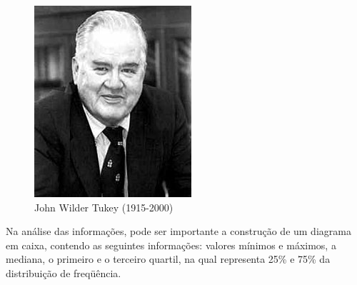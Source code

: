 \vspace{-1.5cm}
\begin{figure}
    \centering
\includegraphics[scale=0.6]{figures/John_Tukey.jpeg}
    \caption{John Wilder Tukey (1915-2000)}
    \label{fig:my_label25}
\end{figure}



Na análise das informações, pode
ser importante a construção de um diagrama em caixa, contendo as
seguintes informações: valores mínimos e máximos, a mediana, o
primeiro e o terceiro quartil, na qual representa 25\% e 75\% da
distribuição de freqüência.\vskip0.3cm




\begin{figure}[!htb]
\end{figure}


